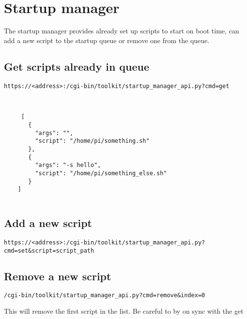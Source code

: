 \documentclass[12pt]{article}
\begin{document}
\section{Startup manager}
    
    The startup manager provides already set up scripts to start on boot time, can add a new script to the startup queue or remove one from the queue.
    
    
    \subsection{Get scripts already in queue}
    
    \texttt{https://<address>:/cgi-bin/toolkit/startup\_manager\_api.py?cmd=get}
    
    \begin{verbatim}
   
   
     [
       {
         "args": "",
         "script": "/home/pi/something.sh"
       },
       {
         "args": "-s hello",
         "script": "/home/pi/something_else.sh"
       }
    ]
    
    \end{verbatim} 
    
    
    \subsection{Add a new script}
    
    \texttt{https://<address>:/cgi-bin/toolkit/startup_manager_api.py?cmd=set&script=script_path}
    
   
   \subsection{Remove a new script}
   
   \texttt{/cgi-bin/toolkit/startup_manager_api.py?cmd=remove&index=0}
   
   This will remove the first script in the list. Be careful to by on sync with the get
   
    
   
\end{document}
